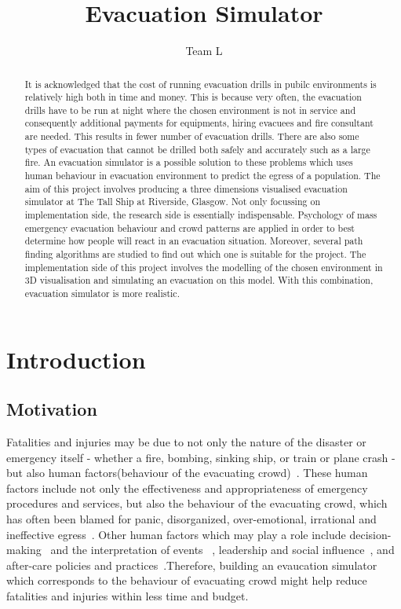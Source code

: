 \documentclass[a4paper,10pt]{article}
\title{Evacuation Simulator}
\author{Team L}
\begin{document}
\maketitle

\begin{abstract}
It is acknowledged that the cost of 
running evacuation drills in pubilc environments is relatively high both in time and money. This is because very often, the 
evacuation drills have to be run at night where the chosen environment is not in service and consequently additional payments for 
equipments, hiring evacuees and fire consultant are needed. This results in fewer number of evacuation drills. 
There are also some types of evacuation that cannot be drilled both safely and accurately such as a large fire.
An evacuation simulator is a possible solution to these problems which uses human behaviour in evacuation environment 
to predict the egress of a population. The aim of this project involves producing a three dimensions visualised 
evacuation simulator at The Tall Ship at Riverside, Glasgow. Not only focussing on implementation side, the research 
side is essentially indispensable. Psychology of mass emergency evacuation behaviour and crowd patterns are applied in 
order to best determine how people will react in an evacuation situation. Moreover, several path finding algorithms 
are studied to find out which one is suitable for the project.
The implementation side of this project 
involves the modelling of the chosen environment in 3D visualisation and simulating an evacuation on this model.
With this combination, evacuation simulator is more realistic.

\end{abstract}

\tableofcontents

\section{Introduction}

\subsection{Motivation}
Fatalities and injuries may be due to not only the nature of the disaster or emergency itself - whether a fire, 
bombing, sinking ship, or train or plane crash - but also human factors(behaviour of the evacuating crowd)~\cite[Section 1.1]{psychology}. These human factors include not only 
the effectiveness and appropriateness of emergency procedures and services, but also the behaviour of the evacuating crowd,
which has often been blamed for panic, disorganized, over-emotional, irrational and ineffective egress~\cite[Section 1.2]{psychology}. 
Other human factors which may play a role include decision-making~\cite[Section 2.2]{psychology} and the interpretation of events~\cite[Section 2.3]{psychology}
, leadership and social influence~\cite[Section 2.9]{psychology}, 
and after-care policies and practices~\cite[Section 3: Social Identity]{psychology}.Therefore, building an evaucation simulator which corresponds to the behaviour 
of evacuating crowd might help reduce fatalities and injuries within less time and budget.
\end{document}
